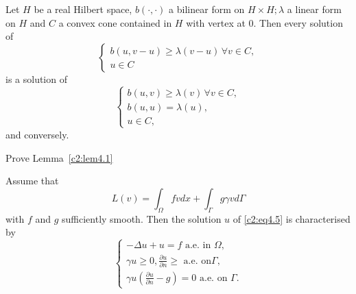 \begin{lemma}\label{c2:lem4.1}%
 Let $H$ be a real Hilbert space, $b(\cdot, \cdot)$ a bilinear form on
 $H \times H ; \lambda$ a linear form on $H$ and $C$ a convex cone
 contained in $H$  with vertex at 0. Then every solution of  
 \begin{equation}
\begin{cases}
 b (u, v-u) \geq \lambda (v-u)\, \forall  v \in C,\\
  u \in C \tag{4.13}\label{c2:eq4.13}
\end{cases}
 \end{equation} 
 is a solution of
 \begin{equation}
\begin{cases}
b (u, v) \geq \lambda(v)\, \forall  v \in C,\\
b(u, u) = \lambda (u),\\
u \in C ,  \tag{4.14}\label{c2:eq4.14}
 \end{cases} 
 \end{equation} 
  and conversely.\pageoriginale 
\end{lemma}

\begin{exercise}\label{c2:exer4.2}%
Prove Lemma~\ref{c2:lem4.1}
\end{exercise}

\begin{proposition}\label{c2:prop4.1}%
 Assume that 	
\begin{equation}
 L(v) = \int_\Omega fv dx + \int_\Gamma g \gamma v d \Gamma
 \tag{4.15}\label{c2:eq4.15}   
\end{equation}
with $f$ and $g$ sufficiently smooth. Then the solution $u$ of
\eqref{c2:eq4.5} is characterised by 
\begin{equation}
\begin{cases}
-\Delta u + u = f \text{ a.e. in }\Omega, \\
\gamma u \geq 0, \frac{\partial u}{\partial n} \geq  \text{ a.e. on
}\Gamma,\\ 
\gamma u (\frac{\partial u}{\partial n} - g) = 0 \text{ a.e. on }
\Gamma. \tag{4.16}\label{c2:eq4.16} 
\end{cases}
\end{equation}
\end{proposition} 

